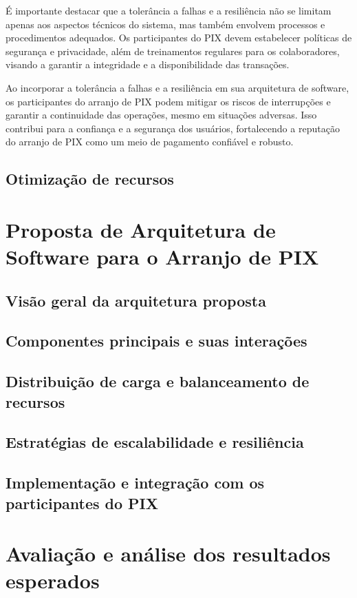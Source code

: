\documentclass[12pt]{article}
\begin{document}
É importante destacar que a tolerância a falhas e a resiliência não se limitam apenas aos aspectos técnicos do sistema, mas também envolvem processos e procedimentos adequados. Os participantes do PIX devem estabelecer políticas de segurança e privacidade, além de treinamentos regulares para os colaboradores, visando a garantir a integridade e a disponibilidade das transações.

Ao incorporar a tolerância a falhas e a resiliência em sua arquitetura de software, os participantes do arranjo de PIX podem mitigar os riscos de interrupções e garantir a continuidade das operações, mesmo em situações adversas. Isso contribui para a confiança e a segurança dos usuários, fortalecendo a reputação do arranjo de PIX como um meio de pagamento confiável e robusto.
\subsection{Otimização de recursos} \label{sec:tecnologia}

\section{Proposta de Arquitetura de Software para o Arranjo de PIX} \label{sec:proposta}
\subsection{Visão geral da arquitetura proposta} \label{sec:proposta}
\subsection{Componentes principais e suas interações} \label{sec:proposta}
\subsection{Distribuição de carga e balanceamento de recursos} \label{sec:proposta}
\subsection{Estratégias de escalabilidade e resiliência} \label{sec:proposta}
\subsection{Implementação e integração com os participantes do PIX} \label{sec:proposta}

\section{Avaliação e análise dos resultados esperados} \label{sec:analise}
\end{document}
